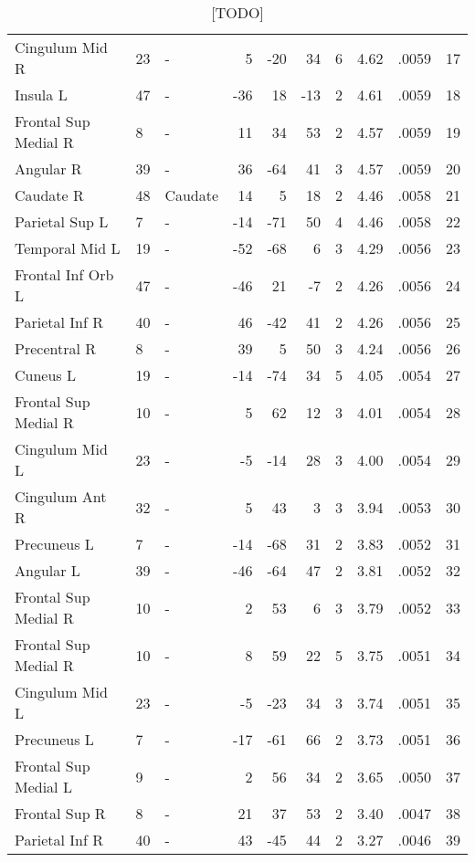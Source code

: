 \begin{table}
\begin{ThreePartTable}
\begin{tabularx}{\textwidth}{l l p{1.6cm} *{3}{r} *{2}{P{.8cm}} P{1.3cm} P{.5cm}}
    Cingulum Mid R & 23 & - & 5 & -20 & 34 & 6 &4.62&.0059& 17 \\
    Insula L & 47 & - & -36 & 18 & -13 & 2 &4.61&.0059& 18 \\
    Frontal Sup Medial R & 8 & - & 11 & 34 & 53 & 2 &4.57&.0059& 19 \\
    Angular R & 39 & - & 36 & -64 & 41 & 3 &4.57&.0059& 20 \\
    Caudate R & 48 & Caudate & 14 & 5 & 18 & 2 &4.46&.0058& 21 \\
    Parietal Sup L & 7 & - & -14 & -71 & 50 & 4 &4.46&.0058& 22 \\
    Temporal Mid L & 19 & - & -52 & -68 & 6 & 3 &4.29&.0056& 23 \\
    Frontal Inf Orb L & 47 & - & -46 & 21 & -7 & 2 &4.26&.0056& 24 \\
    Parietal Inf R & 40 & - & 46 & -42 & 41 & 2 &4.26&.0056& 25 \\
    Precentral R & 8 & - & 39 & 5 & 50 & 3 &4.24&.0056& 26 \\
    Cuneus L & 19 & - & -14 & -74 & 34 & 5 &4.05&.0054& 27 \\
    Frontal Sup Medial R & 10 & - & 5 & 62 & 12 & 3 &4.01&.0054& 28 \\
    Cingulum Mid L & 23 & - & -5 & -14 & 28 & 3 &4.00&.0054& 29 \\
    Cingulum Ant R & 32 & - & 5 & 43 & 3 & 3 &3.94&.0053& 30 \\
    Precuneus L & 7 & - & -14 & -68 & 31 & 2 &3.83&.0052& 31 \\
    Angular L & 39 & - & -46 & -64 & 47 & 2 &3.81&.0052& 32 \\
    Frontal Sup Medial R & 10 & - & 2 & 53 & 6 & 3 &3.79&.0052& 33 \\
    Frontal Sup Medial R & 10 & - & 8 & 59 & 22 & 5 &3.75&.0051& 34 \\
    Cingulum Mid L & 23 & - & -5 & -23 & 34 & 3 &3.74&.0051& 35 \\
    Precuneus L & 7 & - & -17 & -61 & 66 & 2 &3.73&.0051& 36 \\
    Frontal Sup Medial L & 9 & - & 2 & 56 & 34 & 2 &3.65&.0050& 37 \\
    Frontal Sup R & 8 & - & 21 & 37 & 53 & 2 &3.40&.0047& 38 \\
    Parietal Inf R & 40 & - & 43 & -45 & 44 & 2 &3.27&.0046& 39 \\
\bottomrule
    \end{tabularx}
\end{ThreePartTable}
\caption[ Voxel Contrast, , Group]{[TODO] \label{tab:sigasnContrastClusters_sig}}
\end{table}

